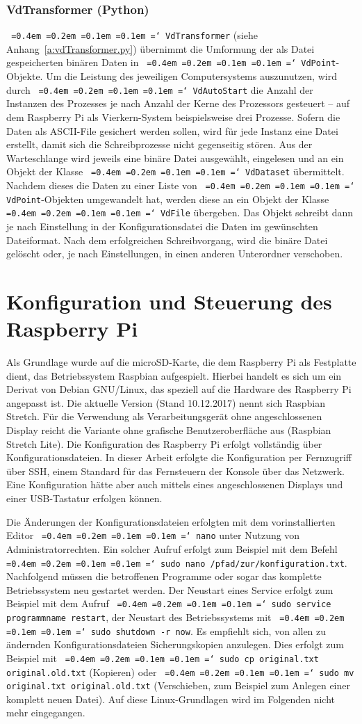 \documentclass[a4paper,12pt,bibliography=totoc, listof=totoc,titlepage,pointlessnumbers]{scrreprt}
\newcommand*\justify{%
  \fontdimen2\font=0.4em%
  \fontdimen3\font=0.2em%
  \fontdimen4\font=0.1em%
  \fontdimen7\font=0.1em%
  \hyphenchar\font=`\-%
}
\newcommand{\code}[1]{\texttt{\justify{#1}}}
\begin{document}
\subsection{VdTransformer (Python)}
\code{VdTransformer} (siehe Anhang~\ref{a:vdTransformer.py}) übernimmt die Umformung der als Datei gespeicherten binären Daten in \code{VdPoint}-Objekte. Um die Leistung des jeweiligen Computersystems auszunutzen, wird durch \code{VdAutoStart} die Anzahl der Instanzen des Prozesses je nach Anzahl der Kerne des Prozessors gesteuert -- auf dem Rasp\-berry Pi als Vierkern-System beispielsweise drei Prozesse. Sofern die Daten als ASCII-File gesichert werden sollen, wird für jede Instanz eine Datei erstellt, damit sich die Schreibprozesse nicht gegenseitig stören. Aus der Warteschlange wird jeweils eine binäre Datei ausgewählt, eingelesen und an ein Objekt der Klasse \code{VdDataset} übermittelt. Nachdem dieses die Daten zu einer Liste von \code{VdPoint}-Objekten umgewandelt hat, werden diese an ein Objekt der Klasse \code{VdFile} übergeben. Das Objekt schreibt dann je nach Einstellung in der Konfigurationsdatei die Daten im gewünschten Dateiformat. Nach dem erfolgreichen Schreibvorgang, wird die binäre Datei gelöscht oder, je nach Einstellungen, in einen anderen Unterordner verschoben.

\chapter{Konfiguration und Steuerung des Rasp\-berry Pi}
\label{c:konfig}

Als Grundlage wurde auf die microSD-Karte, die dem Rasp\-berry Pi als Festplatte dient, das Betriebssystem Raspbian aufgespielt. Hierbei handelt es sich um ein Derivat von Debian GNU/Linux, das speziell auf die Hardware des Rasp\-berry Pi angepasst ist. Die aktuelle Version (Stand 10.12.2017) nennt sich Raspbian Stretch. Für die Verwendung als Verarbeitungsgerät ohne angeschlossenen Display reicht die Variante ohne grafische Benutzeroberfläche aus (Raspbian Stretch Lite). Die Konfiguration des Rasp\-berry Pi erfolgt vollständig über Konfigurationsdateien. In dieser Arbeit erfolgte die Konfiguration per Fernzugriff über SSH, einem Standard für das Fernsteuern der Konsole über das Netzwerk. Eine Konfiguration hätte aber auch mittels eines angeschlossenen Displays und einer USB-Tastatur erfolgen können.

Die Änderungen der Konfigurationsdateien erfolgten mit dem vorinstallierten Editor \code{nano} unter Nutzung von Administratorrechten. Ein solcher Aufruf erfolgt zum Beispiel mit dem Befehl \code{sudo nano /pfad/zur/konfiguration.txt}. Nachfolgend müssen die betroffenen Programme oder sogar das komplette Betriebssystem neu gestartet werden. Der Neustart eines Service erfolgt zum Beispiel mit dem Aufruf \code{sudo service programmname restart}, der Neustart des Betriebssystems mit \code{sudo shutdown -r now}. Es empfiehlt sich, von allen zu ändernden Konfigurationsdateien Sicherungskopien anzulegen. Dies erfolgt zum Beispiel mit \code{sudo cp original.txt original.old.txt} (Kopieren) oder \code{sudo mv original.txt original.old.txt} (Verschieben, zum Beispiel zum Anlegen einer komplett neuen Datei). Auf diese Linux-Grundlagen wird im Folgenden nicht mehr eingegangen.
\end{document}
